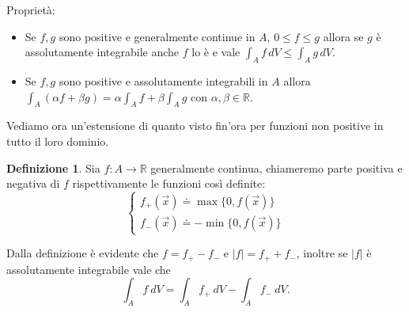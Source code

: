 \documentclass[10pt]{article}
\theoremstyle{plain}
\theoremstyle{definition}
\newtheorem{defn}{Definizione}
\begin{document}
Proprietà:
\begin{itemize}
    \item Se $f,g$ sono positive e generalmente continue in $A$, $0 \le f \le g$ allora se $g$ è assolutamente integrabile anche $f$ lo è e vale $\int_A f\,dV \le \int_A g \,dV$.
    \item Se $f,g$ sono positive e assolutamente integrabili in $A$ allora $\int_A(\alpha f + \beta g) = \alpha \int_A f + \beta \int_A g$ con $\alpha , \beta \in \mathbb{R}$.
\end{itemize}
 Vediamo ora un'estensione di quanto visto fin'ora per funzioni non positive in tutto il loro dominio.
\begin{defn}
Sia $f:A\to \mathbb{R}$ generalmente continua, chiameremo parte positiva e negativa di $f$ rispettivamente le funzioni così definite:
$$\begin{cases}
 f_+(\vec{x})\doteq \max \{ 0,f(\vec{x})\} \\
 f_-(\vec{x})\doteq - \min \{ 0,f(\vec{x})\}
\end{cases}
$$
\end{defn}

Dalla definizione è evidente che $f=f_+-f_-$ e $|f|=f_++f_-$, inoltre se $|f|$ è assolutamente integrabile vale che
$$ \int_A f\ dV = \int_Af_+\ dV-\int_Af_-\ dV.
$$
\end{document}
